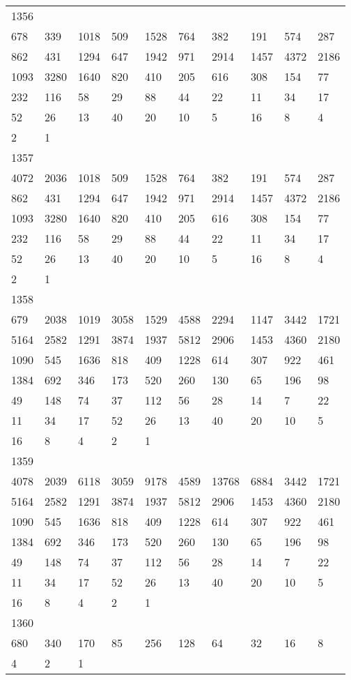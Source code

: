 \begin{longtable}{*{10}{l}}
1356&&&&&&&&&\\
678& 339& 1018& 509& 1528& 764& 382& 191& 574& 287\\
862& 431& 1294& 647& 1942& 971& 2914& 1457& 4372& 2186\\
1093& 3280& 1640& 820& 410& 205& 616& 308& 154& 77\\
232& 116& 58& 29& 88& 44& 22& 11& 34& 17\\
52& 26& 13& 40& 20& 10& 5& 16& 8& 4\\
2& 1& \\

1357&&&&&&&&&\\
4072& 2036& 1018& 509& 1528& 764& 382& 191& 574& 287\\
862& 431& 1294& 647& 1942& 971& 2914& 1457& 4372& 2186\\
1093& 3280& 1640& 820& 410& 205& 616& 308& 154& 77\\
232& 116& 58& 29& 88& 44& 22& 11& 34& 17\\
52& 26& 13& 40& 20& 10& 5& 16& 8& 4\\
2& 1& \\

1358&&&&&&&&&\\
679& 2038& 1019& 3058& 1529& 4588& 2294& 1147& 3442& 1721\\
5164& 2582& 1291& 3874& 1937& 5812& 2906& 1453& 4360& 2180\\
1090& 545& 1636& 818& 409& 1228& 614& 307& 922& 461\\
1384& 692& 346& 173& 520& 260& 130& 65& 196& 98\\
49& 148& 74& 37& 112& 56& 28& 14& 7& 22\\
11& 34& 17& 52& 26& 13& 40& 20& 10& 5\\
16& 8& 4& 2& 1& \\

1359&&&&&&&&&\\
4078& 2039& 6118& 3059& 9178& 4589& 13768& 6884& 3442& 1721\\
5164& 2582& 1291& 3874& 1937& 5812& 2906& 1453& 4360& 2180\\
1090& 545& 1636& 818& 409& 1228& 614& 307& 922& 461\\
1384& 692& 346& 173& 520& 260& 130& 65& 196& 98\\
49& 148& 74& 37& 112& 56& 28& 14& 7& 22\\
11& 34& 17& 52& 26& 13& 40& 20& 10& 5\\
16& 8& 4& 2& 1& \\

1360&&&&&&&&&\\
680& 340& 170& 85& 256& 128& 64& 32& 16& 8\\
4& 2& 1& \\


\end{longtable}
